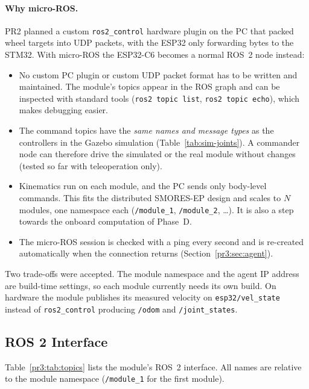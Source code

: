 \documentclass[12pt,a4paper]{article}
\begin{document}
\paragraph{Why micro-ROS.} PR2 planned a custom \texttt{ros2\_control} hardware plugin on the
PC that packed wheel targets into UDP packets, with the ESP32 only forwarding bytes to the
STM32. With micro-ROS the ESP32-C6 becomes a normal ROS~2 node instead:
\begin{itemize}
  \item No custom PC plugin or custom UDP packet format has to be written and maintained.
        The module's topics appear in the ROS graph and can be inspected with standard tools
        (\texttt{ros2 topic list}, \texttt{ros2 topic echo}), which makes debugging easier.
  \item The command topics have the \emph{same names and message types} as the controllers in
        the Gazebo simulation (Table~\ref{tab:sim-joints}). A commander node can therefore drive the simulated or the real
        module without changes (tested so far with teleoperation only).
  \item Kinematics run on each module, and the PC sends only body-level commands. This fits
        the distributed SMORES-EP design and scales to $N$ modules, one namespace each
        (\texttt{/module\_1}, \texttt{/module\_2}, \dots). It is also a step towards the onboard
        computation of Phase~D.
  \item The micro-ROS session is checked with a ping every second and is re-created
        automatically when the connection returns (Section~\ref{pr3:sec:agent}).
\end{itemize}
Two trade-offs were accepted. The module namespace and the agent IP address are build-time
settings, so each module currently needs its own build. On hardware the module publishes its
measured velocity on \texttt{esp32/vel\_state} instead of \texttt{ros2\_control} producing
\texttt{/odom} and \texttt{/joint\_states}.

\subsection{ROS 2 Interface}

Table~\ref{pr3:tab:topics} lists the module's ROS~2 interface. All names are relative to the
module namespace (\texttt{/module\_1} for the first module).
\end{document}
